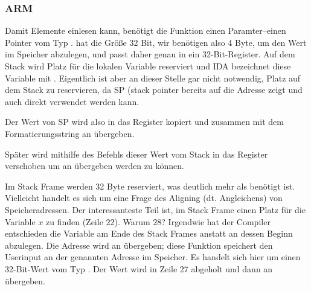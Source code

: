 \subsubsection{ARM}

\myparagraph{\OptimizingKeilVI (\ThumbMode)}



\myindex{\CLanguageElements!\Pointers}
Damit \scanf Elemente einlesen kann, benötigt die Funktion einen Paramter--einen Pointer vom Typ \Tint.
\Tint hat die Größe 32 Bit, wir benötigen also 4 Byte, um den Wert im Speicher abzulegen, und passt daher genau in ein 32-Bit-Register.
Auf dem Stack wird Platz für die lokalen Variable  reserviert und IDA bezeichnet diese Variable mit . 
Eigentlich ist aber an dieser Stelle gar nicht notwendig, Platz auf dem Stack zu reservieren, da \ac{SP} (\gls{stack pointer} 
bereits auf die Adresse zeigt und auch direkt verwendet werden kann.

Der Wert von \ac{SP} wird also in das  Register kopiert und zusammen mit dem Formatierungsstring an \scanf übergeben.



Später wird mithilfe des  Befehls dieser Wert vom Stack in das  Register verschoben um an \printf übergeben werden zu können.




Im Stack Frame werden 32 Byte reserviert, was deutlich mehr als benötigt ist. Vielleicht handelt es sich um eine Frage des Aligning (dt. Angleichens) von Speicheradressen.
Der interessanteste Teil ist, im Stack Frame einen Platz für die Variable $x$ zu finden (Zeile 22).
Warum 28? Irgendwie hat der Compiler entschieden die Variable am Ende des Stack Frames anstatt an dessen Beginn abzulegen.
Die Adresse wird an \scanf übergeben; diese Funktion speichert den Userinput an der genannten Adresse im Speicher.
Es handelt sich hier um einen 32-Bit-Wert vom Typ \Tint. 
Der Wert wird in Zeile 27 abgeholt und dann an \printf übergeben.



